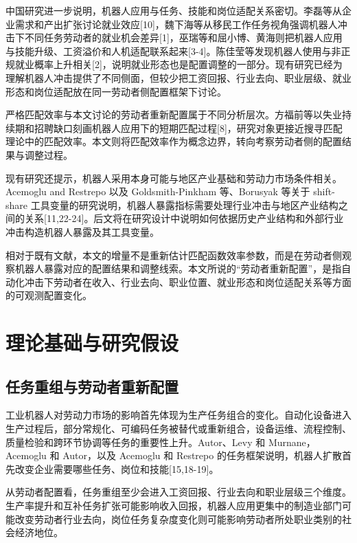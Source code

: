 \documentclass[UTF8, zihao=-4, a4paper, openany, fontset=none]{ctexrep}
\numberwithin{equation}{chapter}
\begin{document}
中国研究进一步说明，机器人应用与任务、技能和岗位适配关系密切。李磊等从企业需求和产出扩张讨论就业效应{[}10{]}，魏下海等从移民工作任务视角强调机器人冲击下不同任务劳动者的就业机会差异{[}1{]}，巫瑞等和屈小博、黄海则把机器人应用与技能升级、工资溢价和人机适配联系起来{[}3-4{]}。陈佳莹等发现机器人使用与非正规就业概率上升相关{[}2{]}，说明就业形态也是配置调整的一部分。现有研究已经为理解机器人冲击提供了不同侧面，但较少把工资回报、行业去向、职业层级、就业形态和岗位适配放在同一劳动者侧配置框架下讨论。

严格匹配效率与本文讨论的劳动者重新配置属于不同分析层次。方福前等以失业持续期和招聘缺口刻画机器人应用下的短期匹配过程{[}8{]}，研究对象更接近搜寻匹配理论中的匹配效率。本文则将匹配效率作为概念边界，转向考察劳动者侧的配置结果与调整过程。

现有研究还提示，机器人采用本身可能与地区产业基础和劳动力市场条件相关。Acemoglu and Restrepo 以及 Goldsmith-Pinkham 等、Borusyak 等关于 shift-share 工具变量的研究说明，机器人暴露指标需要处理行业冲击与地区产业结构之间的关系{[}11,22-24{]}。后文将在研究设计中说明如何依据历史产业结构和外部行业冲击构造机器人暴露及其工具变量。

相对于既有文献，本文的增量不是重新估计匹配函数效率参数，而是在劳动者侧观察机器人暴露对应的配置结果和调整线索。本文所说的``劳动者重新配置''，是指自动化冲击下劳动者在收入、行业去向、职业位置、就业形态和岗位适配关系等方面的可观测配置变化。

\chapter{理论基础与研究假设}\label{ux7406ux8bbaux57faux7840ux4e0eux7814ux7a76ux5047ux8bbe}

\section{任务重组与劳动者重新配置}\label{ux4efbux52a1ux91cdux7ec4ux4e0eux52b3ux52a8ux8005ux91cdux65b0ux914dux7f6e}

工业机器人对劳动力市场的影响首先体现为生产任务组合的变化。自动化设备进入生产过程后，部分常规化、可编码任务被替代或重新组合，设备运维、流程控制、质量检验和跨环节协调等任务的重要性上升。Autor、Levy 和 Murnane，Acemoglu 和 Autor，以及 Acemoglu 和 Restrepo 的任务框架说明，机器人扩散首先改变企业需要哪些任务、岗位和技能{[}15,18-19{]}。

从劳动者配置看，任务重组至少会进入工资回报、行业去向和职业层级三个维度。生产率提升和互补任务扩张可能影响收入回报，机器人应用更集中的制造业部门可能改变劳动者行业去向，岗位任务复杂度变化则可能影响劳动者所处职业类别的社会经济地位。
\end{document}
